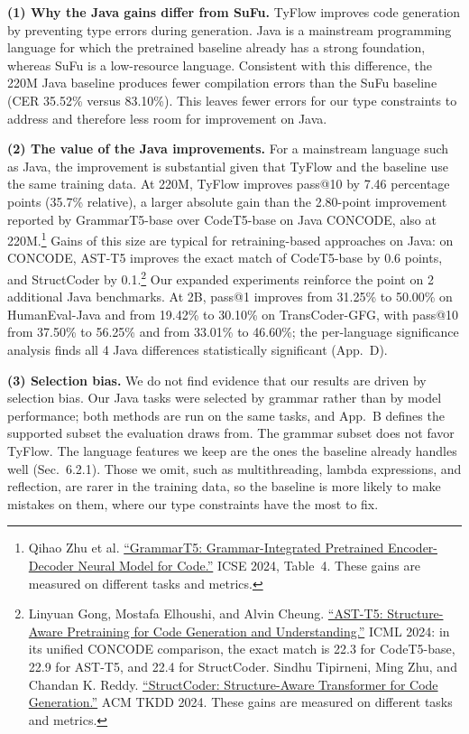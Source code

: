 \documentclass[11pt,a4paper]{article}
\begin{document}
\textbf{(1) Why the Java gains differ from SuFu.} TyFlow improves code generation by preventing type errors during generation. Java is a mainstream programming language for which the pretrained baseline already has a strong foundation, whereas SuFu is a low-resource language. 
Consistent with this difference, the 220M Java baseline produces fewer compilation errors than the SuFu baseline (CER 35.52\% versus 83.10\%). This leaves fewer errors for our type constraints to address and therefore less room for improvement on Java.

\textbf{(2) The value of the Java improvements.} For a mainstream language such as Java, the improvement is substantial given that TyFlow and the baseline use the same training data. At 220M, TyFlow improves pass@10 by 7.46 percentage points (35.7\% relative), a larger absolute gain than the 2.80-point improvement reported by GrammarT5-base over CodeT5-base on Java CONCODE, also at 220M.\footnote{Qihao Zhu et al. \href{https://doi.org/10.1145/3597503.3639125}{``GrammarT5: Grammar-Integrated Pretrained Encoder-Decoder Neural Model for Code.''} ICSE 2024, Table~4. These gains are measured on different tasks and metrics.} Gains of this size are typical for retraining-based approaches on Java: on CONCODE, AST-T5 improves the exact match of CodeT5-base by 0.6 points, and StructCoder by 0.1.\footnote{Linyuan Gong, Mostafa Elhoushi, and Alvin Cheung. \href{https://arxiv.org/abs/2401.03003}{``AST-T5: Structure-Aware Pretraining for Code Generation and Understanding.''} ICML 2024: in its unified CONCODE comparison, the exact match is 22.3 for CodeT5-base, 22.9 for AST-T5, and 22.4 for StructCoder. Sindhu Tipirneni, Ming Zhu, and Chandan K. Reddy. \href{https://doi.org/10.1145/3636430}{``StructCoder: Structure-Aware Transformer for Code Generation.''} ACM TKDD 2024. These gains are measured on different tasks and metrics.} Our expanded experiments reinforce the point on 2 additional Java benchmarks. At 2B, pass@1 improves from 31.25\% to 50.00\% on HumanEval-Java and from 19.42\% to 30.10\% on TransCoder-GFG, with pass@10 from 37.50\% to 56.25\% and from 33.01\% to 46.60\%; the per-language significance analysis finds all 4 Java differences statistically significant (App.~D).

\textbf{(3) Selection bias.} We do not find evidence that our results are driven by selection bias. Our Java tasks were selected by grammar rather than by model performance; both methods are run on the same tasks, and App.~B defines the supported subset the evaluation draws from.
The grammar subset does not favor TyFlow. The language features we keep are the ones the baseline already handles well (Sec.~6.2.1). Those we omit, such as multithreading, lambda expressions, and reflection, are rarer in the training data, so the baseline is more likely to make mistakes on them, where our type constraints have the most to fix.
\end{document}

